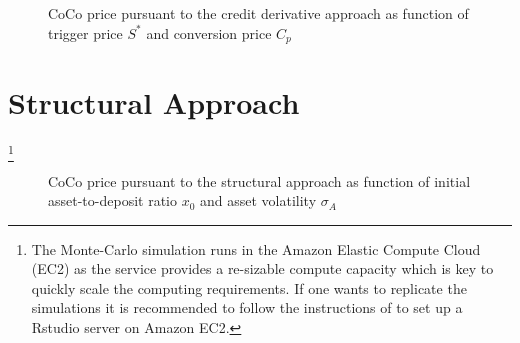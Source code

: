 \begin{figure}[H]
\centering
    \caption[CoCo price pursuant to the equity derivative approach as function of trigger price and conversion price]{CoCo price pursuant to the credit derivative approach as function of trigger price $S^*$ and conversion price $C_p$}
  \end{figure}

\section{Structural Approach}\label{sensistructural}

\footnote{The Monte-Carlo simulation runs in the Amazon Elastic Compute Cloud (EC2) as the service provides a re-sizable compute capacity which is key to quickly scale the computing requirements. If one wants to replicate the simulations it is recommended to follow the instructions of \citet{amazonrstudio} to set up a Rstudio server on Amazon EC2.}
\begin{figure}[H]
\centering
    \caption[CoCo price pursuant to the structural approach as function of asset-to-deposit ratio and asset volatility]{CoCo price pursuant to the structural approach as function of initial asset-to-deposit ratio $x_0$ and asset volatility $\sigma_A$}
  \end{figure}

